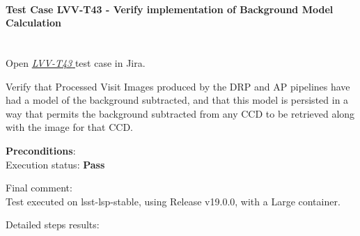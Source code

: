\documentclass[DM,lsstdraft,STR,toc]{lsstdoc}
\begin{document}
\paragraph{Test Case LVV-T43 -  Verify implementation of Background Model Calculation
 }\mbox{}\\

Open  \href{https://jira.lsstcorp.org/secure/Tests.jspa#/testCase/LVV-T43}{\textit{ LVV-T43 } }
test case in Jira.

 Verify that Processed Visit Images produced by the DRP and AP pipelines
have had a model of the background subtracted, and that this model is
persisted in a way that permits the background subtracted from any CCD
to be retrieved along with the image for that CCD.


\textbf{ Preconditions}:\\


Execution status: {\bf Pass }

Final comment:\\ Test executed on lsst-lsp-stable, using Release v19.0.0, with a Large
container.



Detailed steps results:
\end{document}
